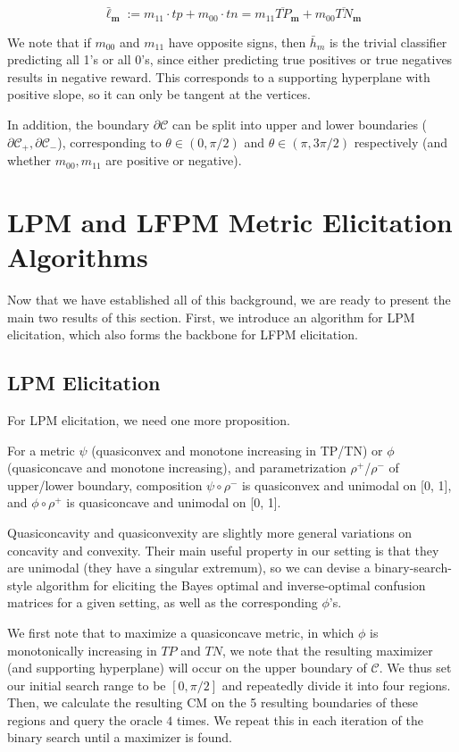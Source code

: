 \documentclass[
  letterpaper,
  numbers=noenddot,
  DIV=11,
  oneside]{scrreprt}
\theoremstyle{remark}
\begin{document}
\[\bar{\ell}_{\mathbf{m}}:=m_{11} \cdot tp+m_{00} \cdot tn=m_{11} \overline{TP}_{\mathbf{m}}+m_{00} \overline{TN}_{\mathbf{m}}\]

We note that if \(m_{00}\) and \(m_{11}\) have opposite signs, then
\(\bar{h}_m\) is the trivial classifier predicting all 1's or all 0's,
since either predicting true positives or true negatives results in
negative reward. This corresponds to a supporting hyperplane with
positive slope, so it can only be tangent at the vertices.

In addition, the boundary \(\partial \mathcal{C}\) can be split into
upper and lower boundaries
(\(\partial \mathcal{C}_{+}, \partial \mathcal{C}_{-}\)), corresponding
to \(\theta \in (0, \pi/2)\) and \(\theta \in (\pi, 3\pi/2)\)
respectively (and whether \(m_{00}, m_{11}\) are positive or negative).

\section{LPM and LFPM Metric Elicitation
Algorithms}\label{sec-orga500da0}

Now that we have established all of this background, we are ready to
present the main two results of this section. First, we introduce an
algorithm for LPM elicitation, which also forms the backbone for LFPM
elicitation.

\subsection{LPM Elicitation}\label{sec-orgb6dac4e}

For LPM elicitation, we need one more proposition.

For a metric \(\psi\) (quasiconvex and monotone increasing in TP/TN) or
\(\phi\) (quasiconcave and monotone increasing), and parametrization
\(\rho^+\)/\(\rho^-\) of upper/lower boundary, composition
\(\psi \circ \rho^-\) is quasiconvex and unimodal on {[}0, 1{]}, and
\(\phi \circ \rho^+\) is quasiconcave and unimodal on {[}0, 1{]}.

Quasiconcavity and quasiconvexity are slightly more general variations
on concavity and convexity. Their main useful property in our setting is
that they are unimodal (they have a singular extremum), so we can devise
a binary-search-style algorithm for eliciting the Bayes optimal and
inverse-optimal confusion matrices for a given setting, as well as the
corresponding \(\phi\)'s.

We first note that to maximize a quasiconcave metric, in which \(\phi\)
is monotonically increasing in \(TP\) and \(TN\), we note that the
resulting maximizer (and supporting hyperplane) will occur on the upper
boundary of \(\mathcal{C}\). We thus set our initial search range to be
\([0, \pi/2]\) and repeatedly divide it into four regions. Then, we
calculate the resulting CM on the 5 resulting boundaries of these
regions and query the oracle \(4\) times. We repeat this in each
iteration of the binary search until a maximizer is found.
\end{document}
